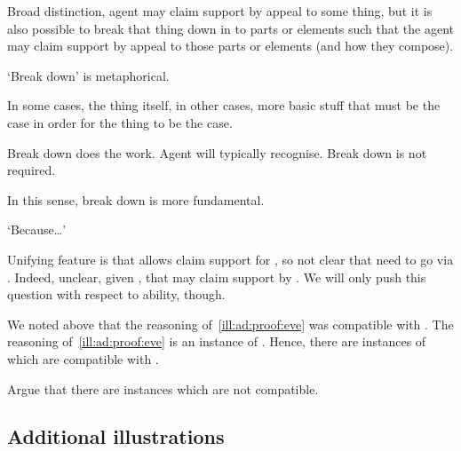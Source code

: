 \begin{note}
  Broad distinction, agent may claim support by appeal to some thing, but it is also possible to break that thing down in to parts or elements such that the agent may claim support by appeal to those parts or elements (and how they compose).

  `Break down' is metaphorical.

  In some cases, the thing itself, in other cases, more basic stuff that must be the case in order for the thing to be the case.

  Break down does the work.
  Agent will typically recognise.
  Break down is not required.

  In this sense, break down is more fundamental.

  `Because\dots'

  Unifying feature is that \adA{} allows claim support for \adB{}, so not clear that need to go via \adB{}.
  Indeed, unclear, given \ESU{}, that may claim support by \adB{}.
  We will only push this question with respect to ability, though.
\end{note}

\begin{note}[\ESU{}]
  We noted above that the reasoning of~\ref{ill:ad:proof:eve} was compatible with \ESU{}.
  The reasoning of~\ref{ill:ad:proof:eve} is an instance of \adB{}.
  Hence, there are instances of \adB{} which are compatible with \ESU{}.

  Argue that there are instances which are not compatible.
\end{note}

\subsection{Additional illustrations}

